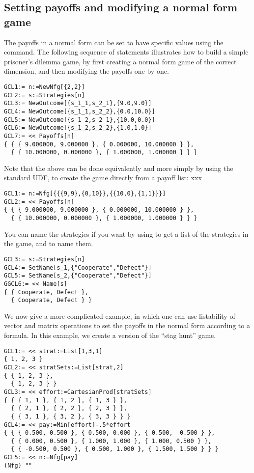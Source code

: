 \subsection{Setting payoffs and modifying a normal form
game}  

The payoffs in a normal form can be set to have specific values using
the  command.  The following sequence of statements
illustrates how to build a simple prisoner's dilemma game, by first
creating a normal form game of the correct dimension, and then
modifying the payoffs one by one.  

\begin{verbatim}
GCL1:= n:=NewNfg[{2,2}]
GCL2:= s:=Strategies[n]
GCL3:= NewOutcome[{s_1_1,s_2_1},{9.0,9.0}]
GCL4:= NewOutcome[{s_1_1,s_2_2},{0.0,10.0}]
GCL5:= NewOutcome[{s_1_2,s_2_1},{10.0,0.0}]
GCL6:= NewOutcome[{s_1_2,s_2_2},{1.0,1.0}]
GCL7:= << Payoffs[n]
{ { { 9.000000, 9.000000 }, { 0.000000, 10.000000 } },
  { { 10.000000, 0.000000 }, { 1.000000, 1.000000 } } }
\end{verbatim}

Note that the above can be done equivalently and more simply by using
the standard UDF,  to create the game directly from a payoff
list:
xxx
\begin{verbatim}
GCL1:= n:=Nfg[{{{9,9},{0,10}},{{10,0},{1,1}}}]
GCL2:= << Payoffs[n]
{ { { 9.000000, 9.000000 }, { 0.000000, 10.000000 } },
  { { 10.000000, 0.000000 }, { 1.000000, 1.000000 } } }
\end{verbatim}

\noindent
You can name the strategies if you want by using  to
get a list of the strategies in the game, and  to name
them.

\begin{verbatim}
GCL3:= s:=Strategies[n]
GCL4:= SetName[s_1,{"Cooperate","Defect"}]
GCL5:= SetName[s_2,{"Cooperate","Defect"}]
GGCL6:= << Name[s]
{ { Cooperate, Defect },
  { Cooperate, Defect } }
\end{verbatim}

We now give a more complicated example, in which one can use
listability of vector and matrix operations to set the payoffs in the
normal form according to a formula.  In this example, we create a
version of the ``stag hunt'' game.

\begin{verbatim}
GCL1:= << strat:=List[1,3,1]
{ 1, 2, 3 }
GCL2:= << stratSets:=List[strat,2]
{ { 1, 2, 3 },
  { 1, 2, 3 } }
GCL3:= << effort:=CartesianProd[stratSets] 
{ { { 1, 1 }, { 1, 2 }, { 1, 3 } },
  { { 2, 1 }, { 2, 2 }, { 2, 3 } },
  { { 3, 1 }, { 3, 2 }, { 3, 3 } } }
GCL4:= << pay:=Min[effort]-.5*effort
{ { { 0.500, 0.500 }, { 0.500, 0.000 }, { 0.500, -0.500 } },
  { { 0.000, 0.500 }, { 1.000, 1.000 }, { 1.000, 0.500 } },
  { { -0.500, 0.500 }, { 0.500, 1.000 }, { 1.500, 1.500 } } }
GCL5:= << n:=Nfg[pay]
(Nfg) ""
\end{verbatim}

